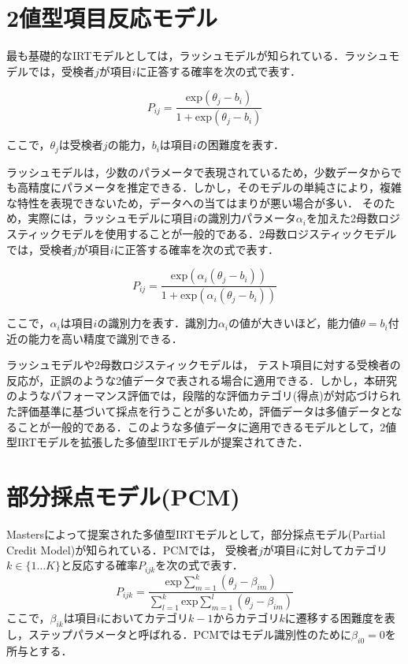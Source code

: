 \documentclass[a4paper,11pt,oneside,openany]{jsbook}
\begin{document}
\section{2値型項目反応モデル}
最も基礎的なIRTモデルとしては，ラッシュモデル\cite{rash}が知られている．ラッシュモデルでは，受検者$j$が項目$i$に正答する確率を次の式で表す．

\begin{equation}
P_{ij} = \frac{\mathrm{exp}(\theta_{j}-b_{i})}{1 + \mathrm{exp}(\theta_{j}-b_{i})}
\end{equation}

ここで，$\theta_{j}$は受検者$j$の能力，$b_{i}$は項目$i$の困難度を表す．

ラッシュモデルは，少数のパラメータで表現されているため，少数データからでも高精度にパラメータを推定できる\cite{rashbenefit}．しかし，そのモデルの単純さにより，複雑な特性を表現できないため，データへの当てはまりが悪い場合が多い\cite{rashloss}．
そのため，実際には，ラッシュモデルに項目$i$の識別力パラメータ$\alpha_{i}$を加えた2母数ロジスティックモデルを使用することが一般的である．2母数ロジスティックモデルでは，受検者$j$が項目$i$に正答する確率を次の式で表す．

\begin{equation}
  P_{ij} = \frac{\mathrm{exp}(\alpha_{i}(\theta_{j}-b_{i}))}{1 + \mathrm{exp}(\alpha_{i}(\theta_{j}-b_{i}))}
  \end{equation}
  
ここで，$\alpha_{i}$は項目$i$の識別力を表す．識別力$\alpha_{i}$の値が大きいほど，能力値$\theta = b_i$付近の能力を高い精度で識別できる．

ラッシュモデルや2母数ロジスティックモデルは， テスト項目に対する受検者の反応が，正誤のような2値データで表される場合に適用できる．しかし，本研究のようなパフォーマンス評価では，段階的な評価カテゴリ(得点)が対応づけられた評価基準に基づいて採点を行うことが多いため，評価データは多値データとなることが一般的である．このような多値データに適用できるモデルとして，2値型IRTモデルを拡張した多値型IRTモデルが提案されてきた．


\section{部分採点モデル(PCM)}
Mastersによって提案された多値型IRTモデルとして，部分採点モデル(Partial Credit Model)\cite{PCM}が知られている．PCMでは， 受検者$j$が項目$i$に対してカテゴリ$k \in \{1\dots K\}$と反応する確率$P_{ijk}$を次の式で表す．
\begin{equation}
P_{ijk} = \frac{\mathrm{exp}\sum_{m=1}^{k}(\theta_{j}-\beta_{im})}{\sum_{l=1}^{k} \mathrm{exp}\sum_{m=1}^{l}(\theta_{j}-\beta_{im})}
\end{equation}
ここで，$\beta_{ik}$は項目$i$においてカテゴリ$k-1$からカテゴリ$k$に遷移する困難度を表し，ステップパラメータと呼ばれる．PCMではモデル識別性のために$\beta_{i0}=0$を所与とする．
\end{document}
